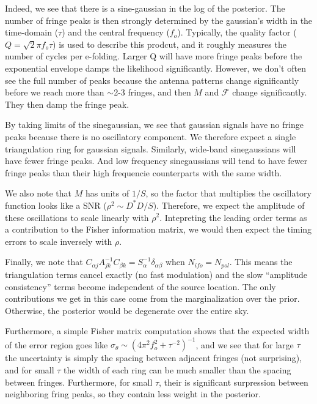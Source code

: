 \documentclass[10pt]{article}
\begin{document}
Indeed, we see that there is a sine-gaussian in the log of the posterior. The number of fringe peaks is then strongly determined by the gaussian's width in the time-domain ($\tau$) and the central frequency ($f_o$). Typically, the quality factor ($Q=\sqrt{2}\pi f_o\tau$) is used to describe this prodcut, and it roughly measures the number of cycles per e-folding. Larger Q will have more fringe peaks before the exponential envelope damps the likelihood significantly. However, we don't often see the full number of peaks because the antenna patterns change significantly before we reach more than $\sim$2-3 fringes, and then $M$ and $\mathcal{F}$ change significantly. They then damp the fringe peak. 

By taking limits of the sinegaussian, we see that gaussian signals have no fringe peaks because there is no oscillatory component. We therefore expect a single triangulation ring for gaussian signals. Similarly, wide-band sinegaussians will have fewer fringe peaks. And low frequency sinegaussians will tend to have fewer fringe peaks than their high frequencie counterparts with the same width.

We also note that $M$ has units of $1/S$, so the factor that multiplies the oscillatory function looks like a SNR ($\rho^2\sim D^\ast D/S$). Therefore, we expect the amplitude of these oscillations to scale linearly with $\rho^2$. Intepreting the leading order terms as a contribution to the Fisher information matrix, we would then expect the timing errors to scale inversely with $\rho$. 

Finally, we note that $C_{\alpha j}A^{-1}_{jk}C_{\beta k} = S_\alpha^{-1}\delta_{\alpha\beta}$ when $N_{ifo}=N_{pol}$. This means the triangulation terms cancel exactly (no fast modulation) and the slow ``amplitude consistency'' terms become independent of the source location. The only contributions we get in this case come from the marginalization over the prior. Otherwise, the posterior would be degenerate over the entire sky.

Furthermore, a simple Fisher matrix computation shows that the expected width of the error region goes like $\sigma_\theta\sim(4\pi^2 f_o^2 + \tau^{-2})^{-1}$, and we see that for large $\tau$ the uncertainty is simply the spacing between adjacent fringes (not surprising), and for small $\tau$ the width of each ring can be much smaller than the spacing between fringes. Furthermore, for small $\tau$, their is significant surpression between neighboring fring peaks, so they contain less weight in the posterior.
\end{document}
